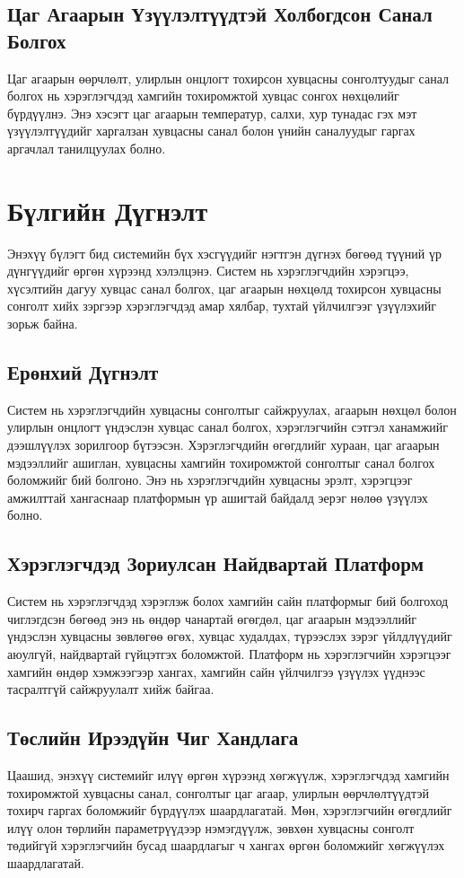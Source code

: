 \subsection{Цаг Агаарын Үзүүлэлтүүдтэй Холбогдсон Санал Болгох}
Цаг агаарын өөрчлөлт, улирлын онцлогт тохирсон хувцасны сонголтуудыг санал болгох нь хэрэглэгчдэд хамгийн тохиромжтой хувцас сонгох нөхцөлийг бүрдүүлнэ. Энэ хэсэгт цаг агаарын температур, салхи, хур тунадас гэх мэт үзүүлэлтүүдийг харгалзан хувцасны санал болон үнийн саналуудыг гаргах аргачлал танилцуулах болно.

\section{Бүлгийн Дүгнэлт}

Энэхүү бүлэгт бид системийн бүх хэсгүүдийг нэгтгэн дүгнэх бөгөөд түүний үр дүнгүүдийг өргөн хүрээнд хэлэлцэнэ. Систем нь хэрэглэгчдийн хэрэгцээ, хүсэлтийн дагуу хувцас санал болгох, цаг агаарын нөхцөлд тохирсон хувцасны сонголт хийх зэргээр хэрэглэгчдэд амар хялбар, тухтай үйлчилгээг үзүүлэхийг зорьж байна.

\subsection{Ерөнхий Дүгнэлт}
Систем нь хэрэглэгчдийн хувцасны сонголтыг сайжруулах, агаарын нөхцөл болон улирлын онцлогт үндэслэн хувцас санал болгох, хэрэглэгчийн сэтгэл ханамжийг дээшлүүлэх зорилгоор бүтээсэн. Хэрэглэгчдийн өгөгдлийг хураан, цаг агаарын мэдээллийг ашиглан, хувцасны хамгийн тохиромжтой сонголтыг санал болгох боломжийг бий болгоно. Энэ нь хэрэглэгчдийн хувцасны эрэлт, хэрэгцээг амжилттай хангаснаар платформын үр ашигтай байдалд эерэг нөлөө үзүүлэх болно.

\subsection{Хэрэглэгчдэд Зориулсан Найдвартай Платформ}
Систем нь хэрэглэгчдэд хэрэглэж болох хамгийн сайн платформыг бий болгоход чиглэгдсэн бөгөөд энэ нь өндөр чанартай өгөгдөл, цаг агаарын мэдээллийг үндэслэн хувцасны зөвлөгөө өгөх, хувцас худалдах, түрээслэх зэрэг үйлдлүүдийг аюулгүй, найдвартай гүйцэтгэх боломжтой. Платформ нь хэрэглэгчийн хэрэгцээг хамгийн өндөр хэмжээгээр хангах, хамгийн сайн үйлчилгээ үзүүлэх үүднээс тасралтгүй сайжруулалт хийж байгаа.

\subsection{Төслийн Ирээдүйн Чиг Хандлага}
Цаашид, энэхүү системийг илүү өргөн хүрээнд хөгжүүлж, хэрэглэгчдэд хамгийн тохиромжтой хувцасны санал, сонголтыг цаг агаар, улирлын өөрчлөлтүүдтэй тохирч гаргах боломжийг бүрдүүлэх шаардлагатай. Мөн, хэрэглэгчийн өгөгдлийг илүү олон төрлийн параметрүүдээр нэмэгдүүлж, зөвхөн хувцасны сонголт төдийгүй хэрэглэгчийн бусад шаардлагыг ч хангах өргөн боломжийг хөгжүүлэх шаардлагатай.



